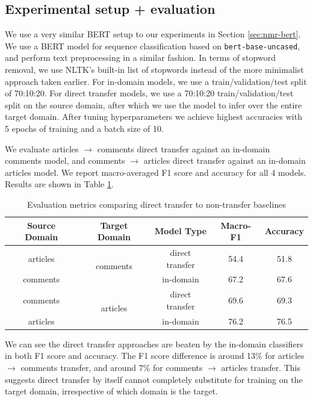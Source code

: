 \subsection{Experimental setup + evaluation}

We use a very similar BERT setup to our experiments in Section \ref{sec:nmr-bert}. We use a BERT model for sequence classification based on \texttt{bert-base-uncased}, and perform text preprocessing in a similar fashion. In terms of stopword removal, we use NLTK's built-in list of stopwords instead of the more minimalist approach taken earlier. For in-domain models, we use a train/validation/test split of 70:10:20. For direct transfer models, we use a 70:10:20 train/validation/test split on the source domain, after which we use the model to infer over the entire target domain. After tuning hyperparameters we achieve highest accuracies with 5 epochs of training and a batch size of 10.

We evaluate articles $ \rightarrow $ comments direct transfer against an in-domain comments model, and comments $ \rightarrow $ articles direct transfer against an in-domain articles model. We report macro-averaged F1 score and accuracy for all 4 models. Results are shown in Table \ref{tab:direct-transfer-results}.

\begin{table}[ht]
    \centering
    \begin{tabular}{|c|c|c|c|c|}
        \hline
        \textbf{Source Domain} & \textbf{Target Domain} & \textbf{Model Type} & \textbf{Macro-F1} & \textbf{Accuracy} \\
        \hline
        articles & \multirow{2}{4em}{comments} & direct transfer & 54.4 & 51.8 \\
        comments & & in-domain & 67.2 & 67.6 \\
        \hline
        comments & \multirow{2}{3em}{articles} & direct transfer & 69.6 & 69.3 \\
        articles & & in-domain & 76.2 & 76.5 \\
        \hline
    \end{tabular}
    \caption{Evaluation metrics comparing direct transfer to non-transfer baselines}
    \label{tab:direct-transfer-results}
\end{table}

We can see the direct transfer approaches are beaten by the in-domain classifiers in both F1 score and accuracy. The F1 score difference is around 13\% for articles $ \rightarrow $ comments transfer, and around 7\% for comments $ \rightarrow $ articles transfer. This suggests direct transfer by itself cannot completely substitute for training on the target domain, irrespective of which domain is the target.


